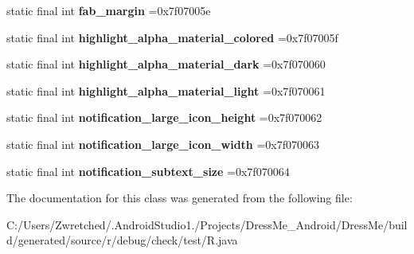 \begin{DoxyCompactItemize}
\item 
\hypertarget{classcheck_1_1test_1_1_r_1_1dimen_a72a408e38067d0df78cda5a194e7ad62}{}static final int {\bfseries fab\+\_\+margin} =0x7f07005e\label{classcheck_1_1test_1_1_r_1_1dimen_a72a408e38067d0df78cda5a194e7ad62}

\item 
\hypertarget{classcheck_1_1test_1_1_r_1_1dimen_a9192d7b6f579e8d781ceabcd7f2ddda4}{}static final int {\bfseries highlight\+\_\+alpha\+\_\+material\+\_\+colored} =0x7f07005f\label{classcheck_1_1test_1_1_r_1_1dimen_a9192d7b6f579e8d781ceabcd7f2ddda4}

\item 
\hypertarget{classcheck_1_1test_1_1_r_1_1dimen_a81d37fe3ccc14c3452d791f45e047521}{}static final int {\bfseries highlight\+\_\+alpha\+\_\+material\+\_\+dark} =0x7f070060\label{classcheck_1_1test_1_1_r_1_1dimen_a81d37fe3ccc14c3452d791f45e047521}

\item 
\hypertarget{classcheck_1_1test_1_1_r_1_1dimen_a134857e8d6cfb16edd84e9e1927a6837}{}static final int {\bfseries highlight\+\_\+alpha\+\_\+material\+\_\+light} =0x7f070061\label{classcheck_1_1test_1_1_r_1_1dimen_a134857e8d6cfb16edd84e9e1927a6837}

\item 
\hypertarget{classcheck_1_1test_1_1_r_1_1dimen_adf9922a400b79cc429f811fdbbc755b2}{}static final int {\bfseries notification\+\_\+large\+\_\+icon\+\_\+height} =0x7f070062\label{classcheck_1_1test_1_1_r_1_1dimen_adf9922a400b79cc429f811fdbbc755b2}

\item 
\hypertarget{classcheck_1_1test_1_1_r_1_1dimen_a671d639e1dcf21244c3d17855cf1b70e}{}static final int {\bfseries notification\+\_\+large\+\_\+icon\+\_\+width} =0x7f070063\label{classcheck_1_1test_1_1_r_1_1dimen_a671d639e1dcf21244c3d17855cf1b70e}

\item 
\hypertarget{classcheck_1_1test_1_1_r_1_1dimen_a1344fc40da4ffe98421636942fd5abe2}{}static final int {\bfseries notification\+\_\+subtext\+\_\+size} =0x7f070064\label{classcheck_1_1test_1_1_r_1_1dimen_a1344fc40da4ffe98421636942fd5abe2}

\end{DoxyCompactItemize}


The documentation for this class was generated from the following file\+:\begin{DoxyCompactItemize}
\item 
C\+:/\+Users/\+Zwretched/.\+Android\+Studio1./\+Projects/\+Dress\+Me\+\_\+\+Android/\+Dress\+Me/build/generated/source/r/debug/check/test/R.\+java\end{DoxyCompactItemize}
